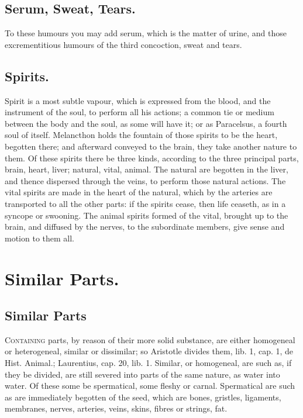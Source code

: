 {\subsection{Serum, Sweat, Tears.}
To these humours you may add serum, which is
the matter of urine, and those excrementitious humours of the third
concoction, sweat and tears.
\subsection{Spirits.}
Spirit is a most subtle vapour, which is expressed from the
blood, and the instrument of the soul, to perform all his actions; a
common tie or medium between the body and the soul, as some will have
it; or as Paracelsus, a fourth soul of itself. Melancthon holds
the fountain of those spirits to be the heart, begotten there; and
afterward conveyed to the brain, they take another nature to them. Of
these spirits there be three kinds, according to the three principal
parts, brain, heart, liver; natural, vital, animal. The natural are
begotten in the liver, and thence dispersed through the veins, to
perform those natural actions. The vital spirits are made in the heart
of the natural, which by the arteries are transported to all the other
parts: if the spirits cease, then life ceaseth, as in a syncope or
swooning. The animal spirits formed of the vital, brought up to the
brain, and diffused by the nerves, to the subordinate members, give
sense and motion to them all.

\section{Similar Parts.}

\subsection{Similar Parts}
\lettrine{C}{ontaining} parts, by reason of their more solid
substance, are either homogeneal or heterogeneal, similar or
dissimilar; so Aristotle divides them, lib. 1, cap. 1, de Hist.
Animal.; Laurentius, cap. 20, lib. 1. Similar, or homogeneal, are such
as, if they be divided, are still severed into parts of the same
nature, as water into water. Of these some be spermatical, some fleshy
or carnal. Spermatical are such as are immediately begotten of the
seed, which are bones, gristles, ligaments, membranes, nerves,
arteries, veins, skins, fibres or strings, fat.
}
